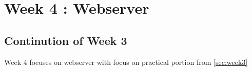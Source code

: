 \section{Week 4 : Webserver}
\subsection{Continution of Week 3}
Week 4 focuses on webserver with focus on practical portion from \autoref{sec:week3}
